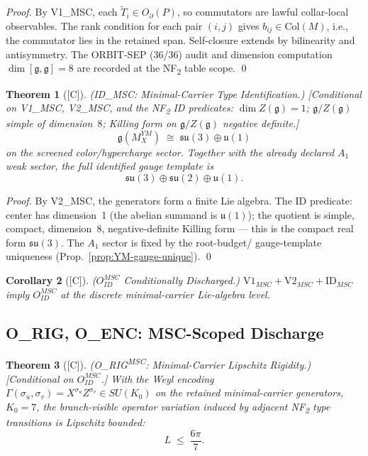 \documentclass[12pt,oneside]{amsbook}
\theoremstyle{plain}
\newtheorem{theorem}{Theorem}[section]
\newtheorem{corollary}[theorem]{Corollary}
\theoremstyle{definition}
\theoremstyle{remark}
\newcommand{\status}[1]{\textup{[#1]}}
\begin{document}
\begin{proof}
By V1\_{MSC}, each $\widetilde{T}_i \in O_\partial(P)$, so commutators
are lawful collar-local observables. The rank condition for each pair
$(i,j)$ gives $b_{ij} \in \mathrm{Col}(M)$, i.e., the commutator lies
in the retained span. Self-closure extends by bilinearity and
antisymmetry. The ORBIT-SEP (36/36) audit and dimension computation
$\dim[\mathfrak{g},\mathfrak{g}] = 8$ are recorded at the NF\textsubscript{2}
table scope.
\qed
\end{proof}

\begin{theorem}[\status{C}]\label{thm:YM-ID-MSC}
\textup{(ID\_{MSC}: Minimal-Carrier Type Identification.)}
\textup{[Conditional on V1\_{MSC}, V2\_{MSC}, and the NF\textsubscript{2}
ID predicates:
$\dim Z(\mathfrak{g}) = 1$;
$\mathfrak{g}/Z(\mathfrak{g})$ simple of dimension~$8$;
Killing form on $\mathfrak{g}/Z(\mathfrak{g})$ negative definite.]}
\[
 \mathfrak{g}(M_X^{YM})
 \;\cong\;
 \mathfrak{su}(3) \oplus \mathfrak{u}(1)
\]
on the screened color/hypercharge sector. Together with the
already declared $A_1$ weak sector, the full identified gauge
template is
\[
 \boxed{\mathfrak{su}(3) \oplus \mathfrak{su}(2) \oplus \mathfrak{u}(1).}
\]
\end{theorem}

\begin{proof}
By V2\_{MSC}, the generators form a finite Lie algebra. The ID
predicate: center has dimension~1 (the abelian summand is
$\mathfrak{u}(1)$); the quotient is simple, compact, dimension~8,
negative-definite Killing form --- this is the compact real form
$\mathfrak{su}(3)$. The $A_1$ sector is fixed by the root-budget/
gauge-template uniqueness (Prop.~\ref{prop:YM-gauge-unique}).
\qed
\end{proof}

\begin{corollary}[\status{C}]\label{cor:YM-OID-MSC}
\textup{($O_{ID}^{MSC}$ Conditionally Discharged.)}
$\mathrm{V1}_{MSC} + \mathrm{V2}_{MSC} + \mathrm{ID}_{MSC}$
imply $O_{ID}^{MSC}$ at the discrete minimal-carrier Lie-algebra level.
\end{corollary}

\subsection{O\_{RIG}, O\_{ENC}: MSC-Scoped Discharge}

\begin{theorem}[\status{C}]\label{thm:YM-RIG-MSC}
\textup{(O\_{RIG}\textsuperscript{MSC}: Minimal-Carrier Lipschitz Rigidity.)}
\textup{[Conditional on $O_{ID}^{MSC}$.]}
With the Weyl encoding $\Gamma(\sigma_u, \sigma_v) = X^{\sigma_u}
Z^{\sigma_v} \in SU(K_0)$ on the retained minimal-carrier generators,
$K_0 = 7$, the branch-visible operator variation induced by adjacent
NF\textsubscript{2} type transitions is Lipschitz bounded:
\[
 \boxed{L \;\le\; \frac{6\pi}{7}.}
\]
\end{theorem}
\end{document}
